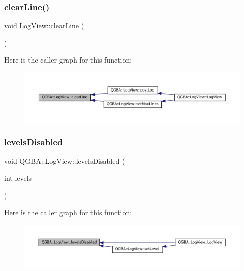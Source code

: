 \subsubsection{\texorpdfstring{clear\+Line()}{clearLine()}}
{\footnotesize\ttfamily void Log\+View\+::clear\+Line (\begin{DoxyParamCaption}{ }\end{DoxyParamCaption})\hspace{0.3cm}{\ttfamily [private]}}

Here is the caller graph for this function\+:
\nopagebreak
\begin{figure}[H]
\begin{center}
\leavevmode
\includegraphics[width=350pt]{class_q_g_b_a_1_1_log_view_ab58e52a5c481261805b6b0f3a08b22a3_icgraph}
\end{center}
\end{figure}
\mbox{\label{class_q_g_b_a_1_1_log_view_a7f3fe25b1a984eb71814990bbf4a8358}} 
\subsubsection{\texorpdfstring{levels\+Disabled}{levelsDisabled}}
{\footnotesize\ttfamily void Q\+G\+B\+A\+::\+Log\+View\+::levels\+Disabled (\begin{DoxyParamCaption}\item[{\mbox{\hyperlink{ioapi_8h_a787fa3cf048117ba7123753c1e74fcd6}{int}}}]{levels }\end{DoxyParamCaption})\hspace{0.3cm}{\ttfamily [signal]}}

Here is the caller graph for this function\+:
\nopagebreak
\begin{figure}[H]
\begin{center}
\leavevmode
\includegraphics[width=350pt]{class_q_g_b_a_1_1_log_view_a7f3fe25b1a984eb71814990bbf4a8358_icgraph}
\end{center}
\end{figure}
\mbox{\label{class_q_g_b_a_1_1_log_view_a57c60f4751bc52c34c3126ff5ab8ac27}} 
